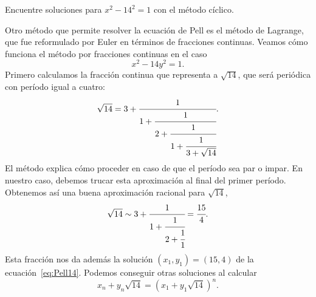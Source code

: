 \begin{exercise}
	Encuentre soluciones para $x^2-14^2=1$ con el método cíclico. 
\end{exercise}

Otro método que permite resolver la ecuación de Pell es el método de Lagrange,
que fue reformulado por Euler en términos de fracciones continuas. 
%
%
Veamos cómo funciona el método por fracciones continuas en el caso
\begin{equation}
	\label{eq:Pell14}
	x^2-14y^2=1.
\end{equation}
Primero calculamos la fracción continua que representa a $\sqrt{14}$, que será
periódica con período igual a cuatro:
\[
	\sqrt{14}=3+\cfrac{1}{1+\cfrac{1}{2+\cfrac{1}{1+\cfrac{1}{3+\sqrt{14}}}}}.
\]
El método explica cómo proceder en caso de que el período sea par o impar. En
nuestro caso, debemos trucar esta aproximación al final del primer período.
Obtenemos así una buena aproximación racional para $\sqrt{14}$, 
\[
	\sqrt{14}\sim 3+\cfrac{1}{1+\cfrac{1}{2+\cfrac{1}{1}}}=\cfrac{15}{4}.
\]
Esta fracción nos da además la solución $(x_1,y_1)=(15,4)$ de la
ecuación~\eqref{eq:Pell14}.  Podemos conseguir otras soluciones al calcular
\[
	x_n+y_n\sqrt{14}=(x_1+y_1\sqrt{14})^n.
\]

